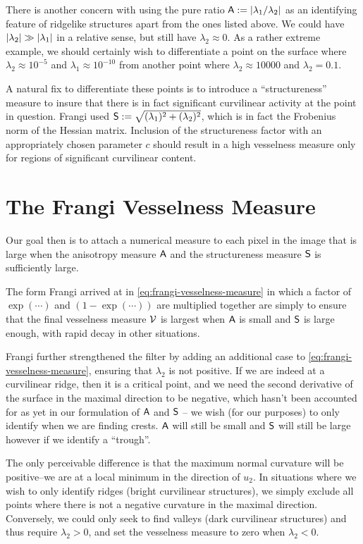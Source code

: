 There is another concern with using the pure ratio $\Am:= \abs{\lambda_1 / \lambda_2}$ as an identifying feature of ridgelike structures apart from the ones listed above. We could have $\abs*{\lambda_2} \gg \abs*{\lambda_1}$ in a relative sense, but still have $\lambda_2 \approx 0$. As a rather extreme example, we should certainly wish to differentiate a point on the surface where $\lambda_2 \approx 10^{-5} $ and $\lambda_1 \approx 10^{-10}$ from another point where $\lambda_2 \approx 10000$ and $\lambda_2 = 0.1$.

A natural fix to differentiate these points is to introduce a ``structureness'' measure to insure that there is in fact significant curvilinear activity at the point in question. Frangi used $\Sm:= \sqrt{(\lambda_1)^2 + (\lambda_2)^2}$, which is in fact the Frobenius norm of the Hessian matrix. Inclusion of the structureness factor with an appropriately chosen parameter $c$ should result in a high vesselness measure only for regions of significant curvilinear content.


\section{The Frangi Vesselness Measure}

Our goal then is to attach a numerical measure to each pixel in the image %
that is large when the anisotropy measure $\Am$ and the structureness measure $\Sm$ is sufficiently large.

The form Frangi arrived at in \cref{eq:frangi-vesselness-measure} in which a factor of $\exp(\cdots)$ and $(1 - \exp(\cdots))$ are multiplied together are simply to ensure that the final vesselness measure $\V$ is largest when $\Am$ is small and $\Sm$ is large enough, with rapid decay in other situations.

Frangi further strengthened the filter by adding an additional case to \cref{eq:frangi-vesselness-measure}, ensuring that $\lambda_2$ is not positive. If we are indeed at a curvilinear ridge, then it is a critical point, and we need the second derivative of the surface in the maximal direction to be negative, which hasn't been accounted for as yet in our formulation of $\Am$ and $\Sm$ -- we wish (for our purposes) to only identify when we are finding crests. $\Am$ will still be small and $\Sm$ will still be large however if we identify a ``trough''.

The only perceivable difference is that the maximum normal curvature will be positive--we are at a local minimum in the direction of $u_2$. In situations where we wish to only identify ridges (bright curvilinear structures), we simply exclude all points where there is not a negative curvature in the maximal direction. Conversely, we could only seek to find valleys (dark curvilinear structures) and thus require $\lambda_2 > 0$, and set the vesselness measure to zero when $\lambda_2 < 0$.



